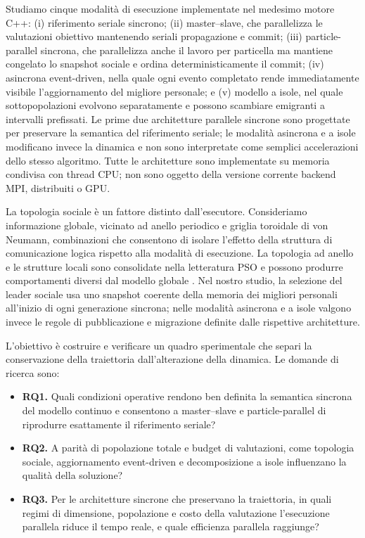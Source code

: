 Studiamo cinque modalità di esecuzione implementate nel medesimo motore C++: (i) riferimento seriale sincrono; (ii) master--slave, che parallelizza le valutazioni obiettivo mantenendo seriali propagazione e commit; (iii) particle-parallel sincrona, che parallelizza anche il lavoro per particella ma mantiene congelato lo snapshot sociale e ordina deterministicamente il commit; (iv) asincrona event-driven, nella quale ogni evento completato rende immediatamente visibile l'aggiornamento del migliore personale; e (v) modello a isole, nel quale sottopopolazioni evolvono separatamente e possono scambiare emigranti a intervalli prefissati. Le prime due architetture parallele sincrone sono progettate per preservare la semantica del riferimento seriale; le modalità asincrona e a isole modificano invece la dinamica e non sono interpretate come semplici accelerazioni dello stesso algoritmo. Tutte le architetture sono implementate su memoria condivisa con thread CPU; non sono oggetto della versione corrente backend MPI, distribuiti o GPU.

La topologia sociale è un fattore distinto dall'esecutore. Consideriamo informazione globale, vicinato ad anello periodico e griglia toroidale di von Neumann, combinazioni che consentono di isolare l'effetto della struttura di comunicazione logica rispetto alla modalità di esecuzione. La topologia ad anello e le strutture locali sono consolidate nella letteratura PSO e possono produrre comportamenti diversi dal modello globale \citep{KennedyMendes2002}. Nel nostro studio, la selezione del leader sociale usa uno snapshot coerente della memoria dei migliori personali all'inizio di ogni generazione sincrona; nelle modalità asincrona e a isole valgono invece le regole di pubblicazione e migrazione definite dalle rispettive architetture.

L'obiettivo è costruire e verificare un quadro sperimentale che separi la conservazione della traiettoria dall'alterazione della dinamica. Le domande di ricerca sono:
\begin{itemize}
  \item \textbf{RQ1.} Quali condizioni operative rendono ben definita la semantica sincrona del modello continuo e consentono a master--slave e particle-parallel di riprodurre esattamente il riferimento seriale?
  \item \textbf{RQ2.} A parità di popolazione totale e budget di valutazioni, come topologia sociale, aggiornamento event-driven e decomposizione a isole influenzano la qualità della soluzione?
  \item \textbf{RQ3.} Per le architetture sincrone che preservano la traiettoria, in quali regimi di dimensione, popolazione e costo della valutazione l'esecuzione parallela riduce il tempo reale, e quale efficienza parallela raggiunge?
\end{itemize}

